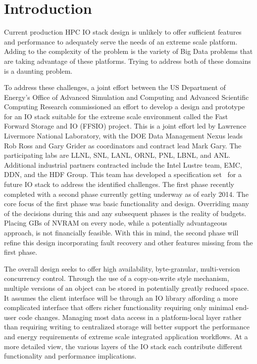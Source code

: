 \documentclass[conference]{IEEEtran}
\begin{document}


\section{Introduction}

Current production HPC IO stack design is unlikely to offer sufficient features
and performance to adequately serve the needs of an extreme scale platform.
Adding to the complexity of the problem is the variety of Big Data problems
that are taking advantage of these platforms. Trying to address both of these
domains is a daunting problem.

To address these challenges, a joint effort between the US Department of
Energy's Office of Advanced Simulation and Computing and Advanced Scientific
Computing Research commissioned an effort to develop a design and prototype for
an IO stack suitable for the extreme scale environment called the Fast Forward
Storage and IO (FFSIO) project. This is a joint effort led by Lawrence
Livermore National Laboratory, with the DOE Data Management Nexus leads Rob
Ross and Gary Grider as coordinators and contract lead Mark Gary. The
participating labs are LLNL, SNL, LANL, ORNL, PNL, LBNL, and ANL.  Additional
industrial partners contracted include the Intel Lustre team, EMC, DDN, and the
HDF Group. This team has developed a specification
set~\cite{fastforward:2014:docs} for a future IO stack to address the
identified challenges. The first phase recently completed with a second phase
currently getting underway as of early 2014. The core focus of the first phase
was basic functionality and design. Overriding many of the decisions during
this and any subsequent phases is the reality of budgets. Placing GBs of NVRAM
on every node, while a potentially advantageous approach, is not financially
feasible. With this in mind, the second phase will refine this design
incorporating fault recovery and other features missing from the first phase.

The overall design seeks to offer high availability, byte-granular,
multi-version concurrency control. Through the use of a copy-on-write style
mechanism, multiple versions of an object can be stored in potentially greatly
reduced space. It assumes the client interface will be through an IO library
affording a more complicated interface that offers richer functionality
requiring only minimal end-user code changes.  Managing most data access in a
platform-local layer rather than requiring writing to centralized storage will
better support the performance and energy requirements of extreme scale
integrated application workflows. At a more detailed view, the various layers
of the IO stack each contribute different functionality and performance
implications.
\end{document}
